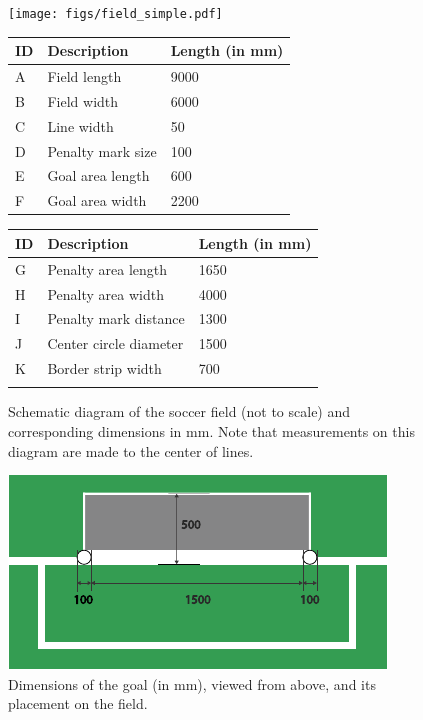\begin{figure}[b!]
  \centering
  \centerline{\texttt{[image: figs/field\_simple.pdf]}}
  \vspace{1ex}
  \begin{tabular}{|l|l|l|}
    ID & Description & Length (in mm) \\
    \hline \hline
    A & Field length & 9000 \\
    \hline
    B & Field width & 6000 \\
    \hline
    C & Line width & 50 \\
    \hline
    D & Penalty mark size & 100 \\
    \hline
    E & Goal area length & 600 \\
    \hline
    F & Goal area width & 2200 \\
  \end{tabular}
  \begin{tabular}{|l|l|l|}
    ID & Description & Length (in mm) \\
    \hline \hline
    G & Penalty area length & 1650 \\
    \hline
    H & Penalty area width & 4000 \\
    \hline
    I & Penalty mark distance & 1300 \\
    \hline
    J & Center circle diameter & 1500 \\
    \hline
    K & Border strip width & 700 \\
    \hline
     &  &  \\
  \end{tabular}
  \caption{Schematic diagram of the soccer field (not to scale) and corresponding dimensions in mm.  Note that measurements on this diagram are made to the center of lines.}
  \label{fig:field_dim}
\end{figure}

\begin{figure}[t!]
  \begin{center}
    \leavevmode
    \includegraphics[width=1\columnwidth]{figs/goalDimensions2015.pdf}
    \caption{Dimensions of the goal (in mm), viewed from above, and its placement on the field.}
    \label{fig:goal_dimensions}
  \end{center}
\end{figure}


